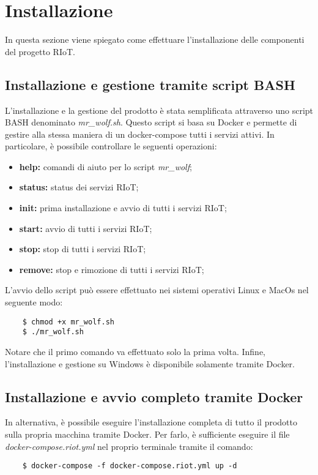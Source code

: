 \section{Installazione}
	In questa sezione viene spiegato come effettuare l'installazione delle componenti del progetto RIoT.

	\subsection{Installazione e gestione tramite script BASH}

	L'installazione e la gestione del prodotto è stata semplificata attraverso uno script BASH denominato \textit{mr\_wolf.sh}. Questo script si basa su Docker e permette di gestire alla stessa maniera di un docker-compose tutti i servizi attivi.
	In particolare, è possibile controllare le seguenti operazioni: 
	\begin{itemize}
		\item \textbf{help:}  	comandi di aiuto per lo script \textit{mr\_wolf};
    	\item \textbf{status:}  status dei servizi RIoT;
    	\item \textbf{init:}  	prima installazione e avvio di tutti i servizi RIoT;
    	\item \textbf{start:} 	avvio di tutti i servizi RIoT;
    	\item \textbf{stop:}  	stop di tutti i servizi RIoT;
    	\item \textbf{remove:}	stop e rimozione di tutti i servizi RIoT;
	\end{itemize}
	L'avvio dello script può essere effettuato nei sistemi operativi Linux e MacOs nel seguente modo:
	\begin{verbatim}
	$ chmod +x mr_wolf.sh
	$ ./mr_wolf.sh
	\end{verbatim}
	Notare che il primo comando va effettuato solo la prima volta.
	\newline
	Infine, l'installazione e gestione su Windows è disponibile solamente tramite Docker.

	\subsection{Installazione e avvio completo tramite Docker}
	
	In alternativa, è possibile eseguire l'installazione completa di tutto il prodotto sulla propria macchina tramite Docker. Per farlo, è sufficiente eseguire il file \textit{docker-compose.riot.yml} nel proprio terminale tramite il comando:
	\begin{verbatim}
	$ docker-compose -f docker-compose.riot.yml up -d
	\end{verbatim}

